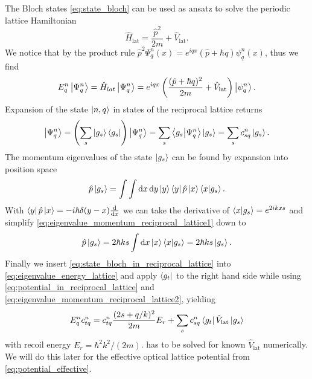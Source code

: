 The Bloch states \cref{eq:state_bloch} can be used as ansatz to solve the
periodic lattice Hamiltonian
\begin{equation}
  \hat{H}_\text{lat}
  =\frac{\hat{p}^2}{2m}+\hat{V}_\text{lat}
  \label{eq:hamiltonian_lattice}.
\end{equation}
We notice that by the product rule
$\hat{p}^2\Psi^n_q(x)=e^{iqx}(\hat{p}+\hbar q)\psi^n_q(x)$,
thus we find
\begin{equation}
  E^n_q\ket{\Psi^n_{q}}
  =\hat{H}_{lat}\ket{\Psi^n_{q}}
  =e^{iqx}\left(\frac{(\hat{p}+\hbar q)^2}{2m}+\hat{V}_\text{lat}\right)\ket{\psi^n_{q}}
  \label{eq:eigenvalue_energy_lattice}.
\end{equation}
Expansion of the state $\ket{n,q}$ in states of the reciprocal lattice returns
\begin{equation}
  \ket{\Psi^n_q}
  =\left(\sum_s\ket{g_s}\bra{g_s}\right)\ket{\Psi^n_q}
  =\sum_s\braket{g_s}{\Psi^n_q}\ket{g_s}
  =\sum_sc^n_{sq}\ket{g_s}
  \label{eq:state_bloch_in_reciprocal_lattice}.
\end{equation}
The momentum eigenvalues of the state $\ket{g_s}$ can be found by expansion
into position space
\begin{equation}
  \hat{p}\ket{g_s}
  =\int\int\dd{x}\dd{y}\ket{y}\bra{y}\hat{p}\ket{x}\bra{x}\ket{g_s}
  \label{eq:eigenvalue_momentum_reciprocal_lattice1}.
\end{equation}
With $\bra{y}\hat{p}\ket{x}=-i\hbar\delta(y-x)\dv{x}$ we can take the
derivative of $\bra{x}\ket{g_s}=e^{2ikxs}$ and simplify
\cref{eq:eigenvalue_momentum_reciprocal_lattice1} down to
\begin{equation}
  \hat{p}\ket{g_s}
  =2\hbar ks\int\dd{x}\ket{x}\bra{x}\ket{g_s}
  =2\hbar ks\ket{g_s}
  \label{eq:eigenvalue_momentum_reciprocal_lattice2}.
\end{equation}
Finally we insert \cref{eq:state_bloch_in_reciprocal_lattice} into
\cref{eq:eigenvalue_energy_lattice} and apply $\bra{g_t}$ to the
right hand side while using \cref{eq:potential_in_reciprocal_lattice} and
\cref{eq:eigenvalue_momentum_reciprocal_lattice2}, yielding
\begin{equation}
  E^n_qc^n_{tq}
  =c^n_{tq}\frac{(2s+q/k)^2}{2m}E_r+\sum_sc^n_{sq}\bra{g_t}\hat{V}_\text{lat}\ket{g_s}
  \label{eq:eigenvalue_energy_lattice_explicit}
\end{equation}
with recoil energy $E_r=\hbar^2k^2/(2m)$.
 has to be solved for known
$\hat{V}_\text{lat}$ numerically. We will do this later for the effective
optical lattice potential from \cref{eq:potential_effective}.

